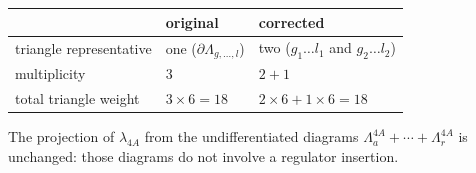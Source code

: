 \documentclass[11pt,a4paper]{article}
\begin{document}
\begin{center}
\begin{tabular}{lll}
\hline
 & original & corrected \\
\hline
triangle representative & one ($\partial\Lambda_{g,\ldots,l}$) & two ($g_1{\ldots}l_1$ and $g_2{\ldots}l_2$) \\
multiplicity & $3$ & $2+1$ \\
total triangle weight & $3\times 6=18$ & $2\times 6+1\times 6=18$ \\
\hline
\end{tabular}
\end{center}

The projection of $\lambda_{4A}$ from the undifferentiated diagrams
$\Lambda^{4A}_{a}+\cdots+\Lambda^{4A}_{r}$ is unchanged: those diagrams do not
involve a regulator insertion.
\end{document}

